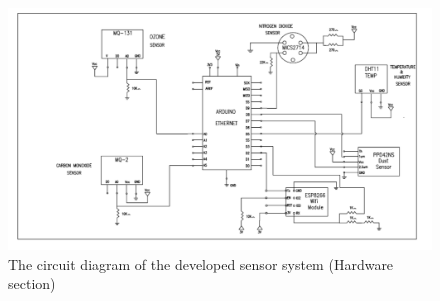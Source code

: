  \begin{figure}[h!]
  \begin{center}
  \includegraphics[scale=0.60]{./images/figure5.png}
  \end{center}
  \caption{The circuit diagram of the developed sensor system (Hardware section)}
  \label{circuit}
\end{figure}


\hspace{1 cm}

